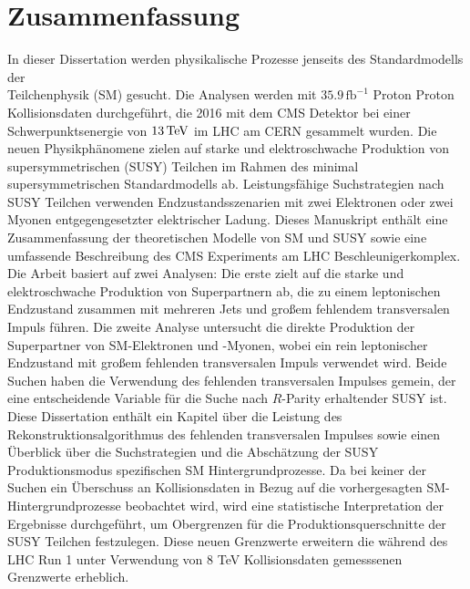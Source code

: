 \chapter*{Zusammenfassung}
\noindent
\justify
In dieser Dissertation werden physikalische Prozesse jenseits des Standardmodells der \\Teilchenphysik (SM) gesucht. 
Die Analysen werden mit $35.9\,\mathrm{fb^{-1}}$ Proton Proton Kollisionsdaten durchgef\"{u}hrt, die 2016 mit dem CMS Detektor bei einer Schwerpunktsenergie von $13\,\text{Te\hspace{-.08em}V}$ im LHC am CERN gesammelt wurden. 
Die neuen Physikph\"{a}nomene zielen auf starke und elektroschwache Produktion von supersymmetrischen (SUSY) Teilchen im Rahmen des minimal supersymmetrischen Standardmodells ab. 
Leistungsf\"{a}hige Suchstrategien nach SUSY Teilchen verwenden Endzustandsszenarien mit zwei Elektronen oder zwei Myonen entgegengesetzter elektrischer Ladung. 
\newpara
\noindent\justify
Dieses Manuskript enth\"{a}lt eine Zusammenfassung der theoretischen Modelle von SM und SUSY sowie eine umfassende Beschreibung des CMS Experiments am LHC Beschleunigerkomplex. 
Die Arbeit basiert auf zwei Analysen: Die erste zielt auf die starke und elektroschwache Produktion von Superpartnern ab, die zu einem leptonischen Endzustand zusammen mit mehreren Jets und gro{\ss}em fehlendem transversalen Impuls f\"{u}hren. 
Die zweite Analyse untersucht die direkte Produktion der Superpartner von SM-Elektronen und -Myonen, wobei ein rein leptonischer Endzustand mit gro{\ss}em fehlenden transversalen Impuls verwendet wird.
Beide Suchen haben die Verwendung des fehlenden transversalen Impulses gemein, der eine entscheidende Variable f\"{u}r die Suche nach $R$-Parity erhaltender SUSY ist. 
Diese Dissertation enth\"{a}lt ein Kapitel \"{u}ber die Leistung des Rekonstruktionsalgorithmus des fehlenden transversalen Impulses sowie einen \"{U}berblick \"{u}ber die Suchstrategien und die Absch\"{a}tzung der SUSY Produktionsmodus spezifischen SM Hintergrundprozesse.
\newpara
\noindent\justify
Da bei keiner der Suchen ein \"{U}berschuss an Kollisionsdaten in Bezug auf die vorhergesagten SM-Hintergrundprozesse beobachtet wird, wird eine statistische Interpretation der Ergebnisse durchgef\"{u}hrt, um Obergrenzen f\"{u}r die Produktionsquerschnitte der SUSY Teilchen festzulegen. 
Diese neuen Grenzwerte erweitern die w\"{a}hrend des LHC Run 1 unter Verwendung von 8 TeV Kollisionsdaten gemesssenen Grenzwerte erheblich. 
